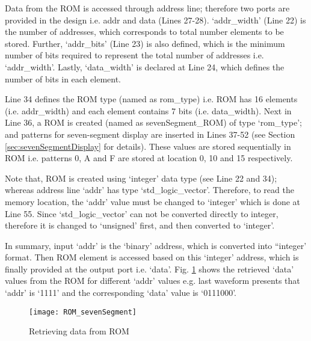 \begin{explanation}
	Data from the ROM is accessed through address line; therefore two ports are provided in the design i.e. addr and data (Lines 27-28). `addr\_width' (Line 22) is the number of addresses, which corresponds to total number elements to be stored. Further, `addr\_bits' (Line 23) is also defined, which is the minimum number of bits required to represent the total number of addresses i.e. `addr\_width'. Lastly, `data\_width' is declared at Line 24, which defines the number of bits in each element.
	
	Line 34 defines the ROM type (named as rom\_type) i.e. ROM has 16 elements (i.e. addr\_width) and each element contains 7 bits (i.e. data\_width). Next in Line 36, a ROM is created (named as sevenSegment\_ROM) of type `rom\_type'; and patterns for seven-segment display are inserted in Lines 37-52 (see Section \ref{sec:sevenSegmentDisplay} for details). These values are stored sequentially in ROM i.e. patterns 0, A and F are stored at location 0, 10 and 15 respectively. 
	
	 Note that, ROM is created using `integer' data type (see Line 22 and 34); whereas address line `addr' has type `std\_logic\_vector'. Therefore, to read the memory location, the `addr' value must be changed to `integer' which is done at Line 55. Since `std\_logic\_vector' can not be converted directly to integer, therefore it is changed to `unsigned' first, and then converted to `integer'. 
	 
	 In summary, input `addr' is the `binary' address, which is converted into ``integer' format. Then ROM element is accessed based on this `integer' address, which is finally provided at the output port i.e. `data'. Fig. \ref{fig:ROM_sevenSegment} shows the retrieved `data' values from the ROM for different `addr' values e.g. last waveform presents that `addr' is `1111' and the corresponding `data' value is `0111000'. 
	 
	 \begin{figure}[!h]
	 	\centering
	 	\texttt{[image: ROM\_sevenSegment]}
	 	\caption{Retrieving data from ROM}
	 	\label{fig:ROM_sevenSegment}
	 \end{figure}
\end{explanation}




